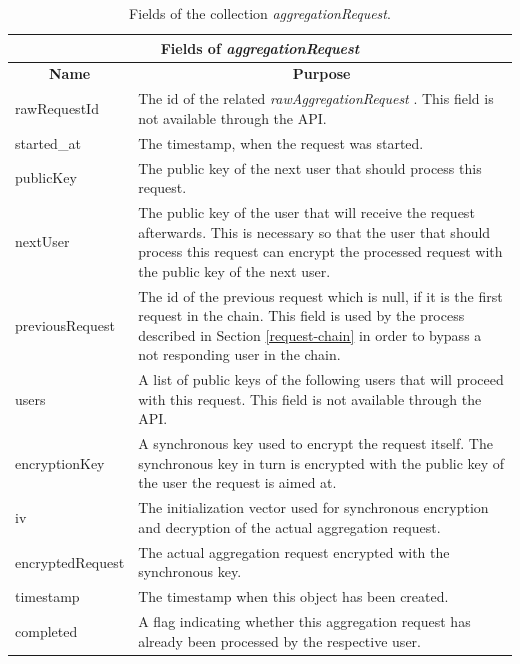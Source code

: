 \begin{table}[]
  \centering
  \begin{tabularx}{\textwidth}{|l|X|}
    \hline
    \multicolumn{2}{|c|}{\textbf{Fields of \textit{aggregationRequest}}}                     \\ \hline
     \multicolumn{1}{|c|}{\textbf{Name}}        & \multicolumn{1}{c|}{\textbf{Purpose}}       \\ \hline
    rawRequestId     & The id of the related \textit{rawAggregationRequest} . This field is not available through the API. \\ \hline
    started\_at      & The timestamp, when the request was started. \\ \hline
    publicKey        & The public key of the next user that should process this request.   \\ \hline
    nextUser        & The public key of the user that will receive the request afterwards. This is necessary so that the user that should process this request can encrypt the processed request with the public key of the next user.
     \\ \hline
    previousRequest        & The id of the previous request which is null, if it is the first request in the chain. This field is used by the process described in Section \ref{request-chain} in order to bypass a not responding user in the chain.
     \\ \hline
    users        & A list of public keys of the following users that will proceed with this request. This field is not available through the API.
     \\ \hline
    encryptionKey        & A synchronous key used to encrypt the request itself. The synchronous key in turn is encrypted with the public key of the user the request is aimed at.
     \\ \hline
    iv        & The initialization vector used for synchronous encryption and decryption of the actual aggregation request.
     \\ \hline
    encryptedRequest        & The actual aggregation request encrypted with the synchronous key. \\ \hline
    timestamp        & The timestamp when this object has been created. \\ \hline
    completed        & A flag indicating whether this aggregation request has already been processed by the respective user.
     \\ \hline
  \end{tabularx}
    \caption{Fields of the collection \textit{aggregationRequest}.}
  \label{aggregationRequest}
\end{table}

